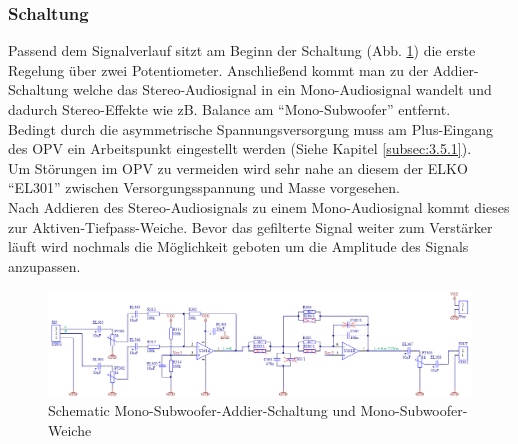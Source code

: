 \subsubsection{Schaltung}\label{subsec:4.2.2}
Passend dem Signalverlauf sitzt am Beginn der Schaltung (Abb. \ref{fig:4.2.2.1}) die erste Regelung über zwei Potentiometer.
Anschließend kommt man zu der Addier-Schaltung welche das Stereo-Audiosignal in ein Mono-Audiosignal wandelt und dadurch Stereo-Effekte wie zB. Balance am \enquote{Mono-Subwoofer} entfernt.\\
Bedingt durch die asymmetrische Spannungsversorgung muss am Plus-Eingang des OPV ein Arbeitspunkt eingestellt werden (Siehe Kapitel \ref{subsec:3.5.1}).\\
Um Störungen im OPV zu vermeiden wird sehr nahe an diesem der ELKO \enquote{EL301} zwischen Versorgungsspannung und Masse vorgesehen.\\
Nach Addieren des Stereo-Audiosignals zu einem Mono-Audiosignal kommt dieses zur Aktiven-Tiefpass-Weiche.
Bevor das gefilterte Signal weiter zum Verstärker läuft wird nochmals die Möglichkeit geboten um die Amplitude des Signals anzupassen.
\begin{landscape}
	\vspace*{\fill}
	\begin{figure} [H]
		\centering
		\includegraphics[width=\linewidth,height=0.9\textheight,keepaspectratio]{img/Print3/3mTTWeicheruAddiererDiplSchematicV2.PNG}
		\caption{Schematic Mono-Subwoofer-Addier-Schaltung und Mono-Subwoofer-Weiche}
		\label {fig:4.2.2.1}
	\end{figure}
	\vfill
\end{landscape}
\raggedbottom



